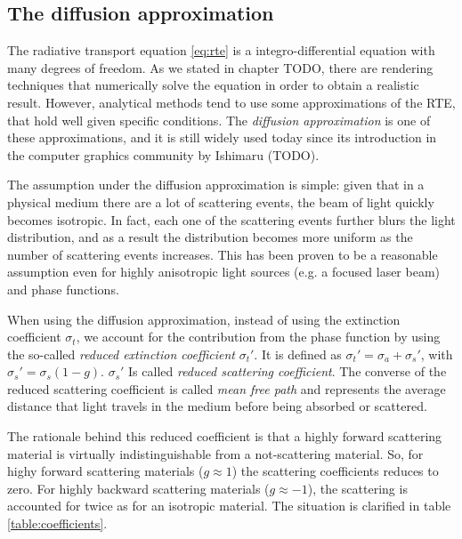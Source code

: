 \subsection{The diffusion approximation}
The radiative transport equation \ref{eq:rte} is a integro-differential equation with many degrees of freedom. As we stated in chapter TODO, there are rendering techniques that numerically solve the equation in order to obtain a realistic result. However, analytical methods tend to use some approximations of the RTE, that hold well given specific conditions. The \emph{diffusion approximation} is one of these approximations, and it is still widely used today since its introduction in the computer graphics community by Ishimaru (TODO). 

The assumption under the diffusion approximation is simple: given that in a physical medium there are a lot of scattering events, the beam of light quickly becomes isotropic. In fact, each one of the scattering events further blurs the light distribution, and as a result the distribution becomes more uniform as the number of scattering events increases. This has been proven to be a reasonable assumption even for highly anisotropic light sources (e.g. a focused laser beam) and phase functions.

When using the diffusion approximation, instead of using the extinction coefficient $\sigma_t$, we account for the contribution from the phase function by using the so-called \emph{reduced extinction coefficient} $\sigma_t'$. It is defined as $\sigma_t' = \sigma_a + \sigma_s'$, with $\sigma_s' = \sigma_s (1 - g)$. $\sigma_s'$ Is called \emph{reduced scattering coefficient}. The converse of the reduced scattering coefficient is called \emph{mean free path} and represents the average distance that light travels in the medium before being absorbed or scattered.

The rationale behind this reduced coefficient is that a highly forward scattering material is virtually indistinguishable from a not-scattering material. So, for highy forward scattering materials ($g \approx 1$) the scattering coefficients reduces to zero. For highly backward scattering materials ($g \approx -1$), the scattering is accounted for twice as for an isotropic material. The situation is clarified in table \ref{table:coefficients}.


